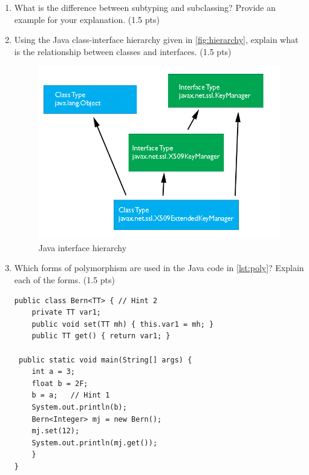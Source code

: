 \documentclass [11pt, a4wide, twoside]{article}
\begin{document}
\begin{enumerate}
\item What is the difference between subtyping and subclassing? Provide an example for your explanation. (1.5 pts)

\vspace{0.5cm}

\solution{}



\item Using the Java class-interface hierarchy given in \autoref{fig:hierarchy}, explain what is the relationship between classes and interfaces. (1.5 pts)

\begin{figure}[h!]
\includegraphics[width=0.5\linewidth]{figs/hierarchy.jpg}
\caption{Java interface hierarchy}
\label{fig:hierarchy}
\end{figure}

\vspace{0.5cm}

\solution{}



\item Which forms of polymorphism are used in the Java code in \autoref{lst:poly}? Explain each of the forms. (1.5 pts)

\begin{lstlisting}[float=h,style=Java,caption={Forms of polymorphism},label=lst:poly]
public class Bern<TT> { // Hint 2
    private TT var1;
    public void set(TT mh) { this.var1 = mh; }
    public TT get() { return var1; }

 public static void main(String[] args) {
 	int a = 3;
	float b = 2F;
	b = a;   // Hint 1
	System.out.println(b);
	Bern<Integer> mj = new Bern();
	mj.set(12);
	System.out.println(mj.get());
	}
}
\end{lstlisting}


\end{enumerate}
\end{document}
